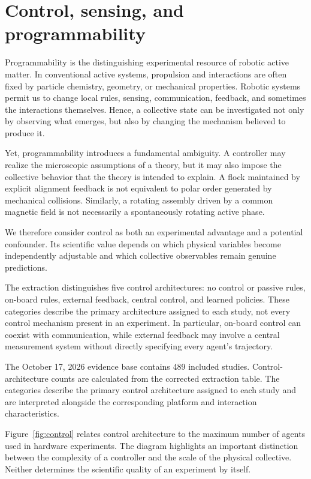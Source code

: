 \section{Control, sensing, and programmability}
\label{sec:control}

Programmability is the distinguishing experimental resource of
robotic active matter. In conventional active systems, propulsion
and interactions are often fixed by particle chemistry, geometry,
or mechanical properties. Robotic systems permit us to change
local rules, sensing, communication, feedback, and sometimes
the interactions themselves. Hence, a collective state can be
investigated not only by observing what emerges, but also by
changing the mechanism believed to produce it.

Yet, programmability introduces a fundamental ambiguity. A
controller may realize the microscopic assumptions of a theory,
but it may also impose the collective behavior that the theory
is intended to explain. A flock maintained by explicit
alignment feedback is not equivalent to polar order generated
by mechanical collisions. Similarly, a rotating assembly
driven by a common magnetic field is not necessarily a
spontaneously rotating active phase.

We therefore consider control as both an experimental advantage
and a potential confounder. Its scientific value depends on
which physical variables become independently adjustable and
which collective observables remain genuine predictions.

The extraction distinguishes five control architectures:
no control or passive rules, on-board rules, external feedback,
central control, and learned policies. These categories describe
the primary architecture assigned to each study, not every
control mechanism present in an experiment. In particular,
on-board control can coexist with communication, while
external feedback may involve a central measurement system
without directly specifying every agent's trajectory.

The October 17, 2026 evidence base contains
489 included studies. Control-architecture
counts are calculated from the corrected
extraction table. The categories describe
the primary control architecture assigned
to each study and are interpreted alongside
the corresponding platform and interaction
characteristics.

Figure~\ref{fig:control} relates control architecture to
the maximum number of agents used in hardware experiments.
The diagram highlights an important distinction between
the complexity of a controller and the scale of the
physical collective. Neither determines the scientific
quality of an experiment by itself.

